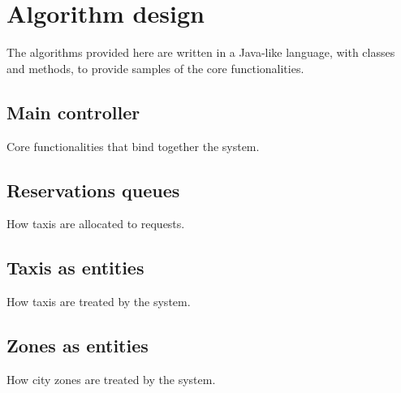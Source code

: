 \chapter{Algorithm design}
The algorithms provided here are written in a Java-like language, with classes and methods, to provide samples of the core functionalities.

\section{Main controller}
Core functionalities that bind together the system.


\section{Reservations queues}
How taxis are allocated to requests.


\section{Taxis as entities}
How taxis are treated by the system.


\section{Zones as entities}
How city zones are treated by the system.


